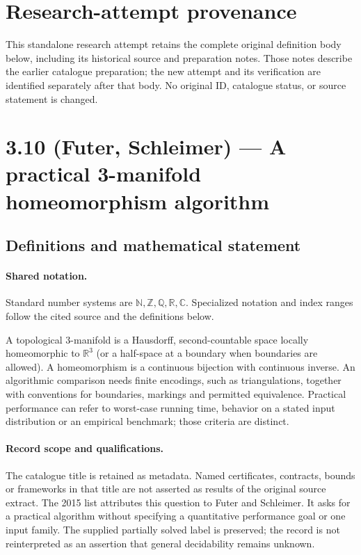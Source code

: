 \documentclass[11pt]{article}
\begin{document}
\section*{Research-attempt provenance}
This standalone research attempt retains the complete original definition body below,
including its historical source and preparation notes. Those notes describe the
earlier catalogue preparation; the new attempt and its verification are identified
separately after that body. No original ID, catalogue status, or source statement is changed.

\section{3.10 (Futer, Schleimer) — A practical 3-manifold homeomorphism algorithm}\label{statement}

\subsection{Definitions and mathematical statement}

\paragraph{Shared notation.}Standard number systems are $\mathbb N,\mathbb Z,\mathbb Q,\mathbb R,\mathbb C$. Specialized notation and index ranges follow the cited source and the definitions below.


A topological $3$-manifold is a Hausdorff, second-countable space locally homeomorphic to $\mathbb R^3$ (or a half-space at a boundary when boundaries are allowed). A homeomorphism is a continuous bijection with continuous inverse. An algorithmic comparison needs finite encodings, such as triangulations, together with conventions for boundaries, markings and permitted equivalence. Practical performance can refer to worst-case running time, behavior on a stated input distribution or an empirical benchmark; those criteria are distinct.
\paragraph{Record scope and qualifications.}
The catalogue title is retained as metadata. Named certificates, contracts, bounds or frameworks in that title are not asserted as results of the original source extract.
The 2015 list attributes this question to Futer and Schleimer. It asks for a practical algorithm without specifying a quantitative performance goal or one input family. The supplied partially solved label is preserved; the record is not reinterpreted as an assertion that general decidability remains unknown.
\end{document}
